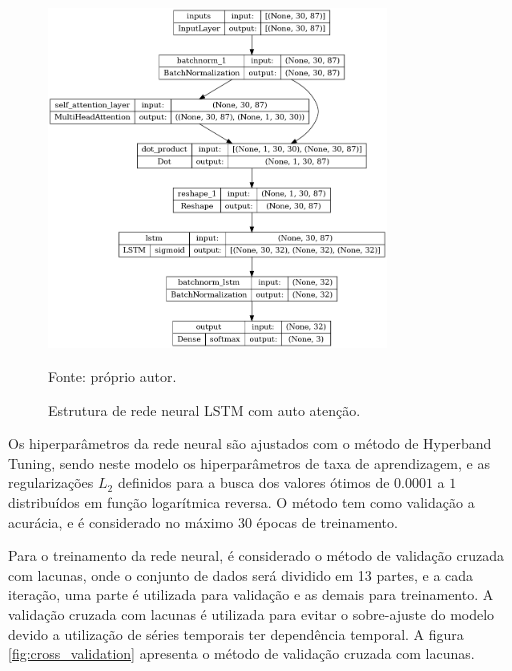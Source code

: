         \begin{figure}[htp]
            \centering
            \caption{Estrutura de rede neural LSTM com auto atenção.}
            \label{fig:model_lstm_SelfAtt}
            \includegraphics[width=0.8\textwidth]{./imagens/lstm_selfatt.png}
            \par \footnotesize Fonte: próprio autor.
        \end{figure}


        \ipar Os hiperparâmetros da rede neural são ajustados com o método de Hyperband Tuning, sendo neste modelo os hiperparâmetros de taxa de aprendizagem, e as regularizações $L_{2}$ definidos para a busca dos valores ótimos de $0.0001$ a $1$ distribuídos em função logarítmica reversa. O método tem como validação a acurácia, e é considerado no máximo 30 épocas de treinamento.

        \ipar Para o treinamento da rede neural, é considerado o método de validação cruzada com lacunas, onde o conjunto de dados será dividido em 13 partes, e a cada iteração, uma parte é utilizada para validação e as demais para treinamento. A validação cruzada com lacunas é utilizada para evitar o sobre-ajuste do modelo devido a utilização de séries temporais ter dependência temporal. A figura \ref{fig:cross_validation} apresenta o método de validação cruzada com lacunas.

